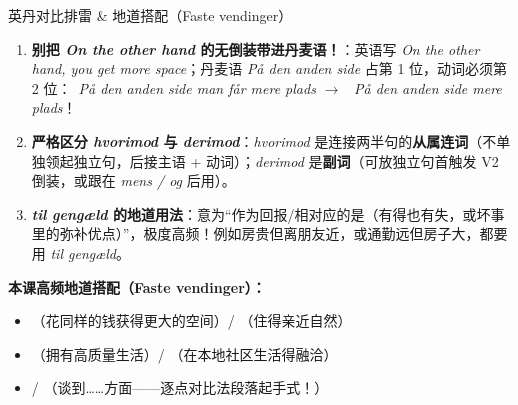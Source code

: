 \begin{grammatikbox}{英丹对比排雷 \& 地道搭配（Faste vendinger）}
\begin{enumerate}
  \item \textbf{别把 \textit{On the other hand} 的无倒装带进丹麦语！}：英语写 \textit{On the other hand, you get more space}；丹麦语 \textit{På den anden side} 占第 1 位，动词必须第 2 位：\ \textit{På den anden side man får mere plads} $\rightarrow$ \ \textit{På den anden side  mere plads}！
  \item \textbf{严格区分 \textit{hvorimod} 与 \textit{derimod}}：\textit{hvorimod} 是连接两半句的\textbf{从属连词}（不单独领起独立句，后接主语 + 动词）；\textit{derimod} 是\textbf{副词}（可放独立句首触发 V2 倒装，或跟在 \textit{mens / og} 后用）。
  \item \textbf{\textit{til gengæld} 的地道用法}：意为“作为回报/相对应的是（有得也有失，或坏事里的弥补优点）”，极度高频！例如房贵但离朋友近，或通勤远但房子大，都要用 \textit{til gengæld}。
\end{enumerate}

\textbf{本课高频地道搭配（Faste vendinger）：}
\begin{itemize}
  \item {}（花同样的钱获得更大的空间）/ （住得亲近自然）
  \item {}（拥有高质量生活）/ （在本地社区生活得融洽）
  \item {} / （谈到……方面——逐点对比法段落起手式！）
\end{itemize}
\end{grammatikbox}


